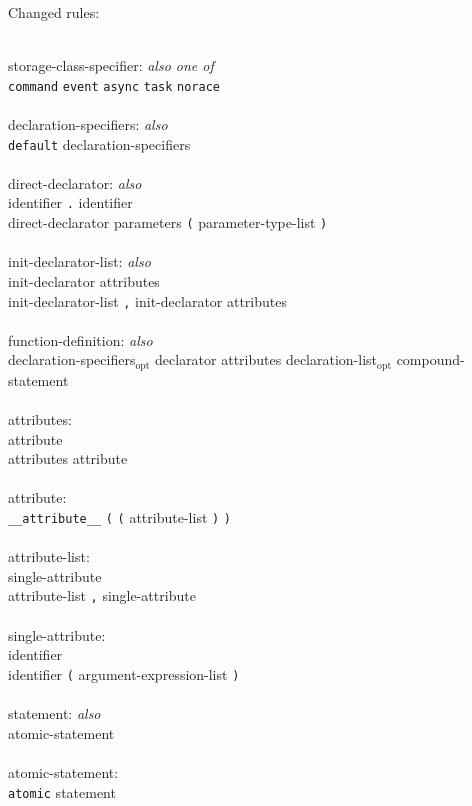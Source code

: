 \documentclass[11pt,letterpaper]{article}
\newcommand{\kw}[1]{{\tt #1}}
\newcommand{\opt}{$_{\mbox{opt}}$\xspace}
\newcommand{\grammarindent}{\hspace*{2cm}\= \\ \kill}
\begin{document}
Changed rules: 
\em \begin{tabbing}
\grammarindent
storage-class-specifier: \emph{also one of}\\
\>	\kw{command} \kw{event} \kw{async} \kw{task} \kw{norace}\\
\\
declaration-specifiers: \emph{also}\\
\>	\kw{default} declaration-specifiers\\
\\
direct-declarator: \emph{also}\\
\>	identifier \kw{.} identifier \\
\>	direct-declarator parameters \kw{(} parameter-type-list \kw{)}\\
\\
init-declarator-list: \emph{also}\\
\>	init-declarator attributes\\
\>	init-declarator-list \kw{,} init-declarator attributes\\
\\
function-definition: \emph{also}\\
\>	declaration-specifiers\opt declarator attributes declaration-list\opt compound-statement\\
\\
attributes:\\
\>	attribute\\
\>	attributes attribute\\
\\
attribute:\\
\>	\kw{\_\_attribute\_\_} \kw{(} \kw{(} attribute-list \kw{)} \kw{)}\\
\\
attribute-list:\\
\>	single-attribute\\
\>	attribute-list \kw{,} single-attribute\\
\\
single-attribute:\\
\>	identifier\\
\>	identifier \kw{(} argument-expression-list \kw{)}\\
\\
statement: \emph{also}\\
\>	atomic-statement\\
\\
atomic-statement:\\
\>	\kw{atomic} statement\\
\\

\end{tabbing}
\end{document}
